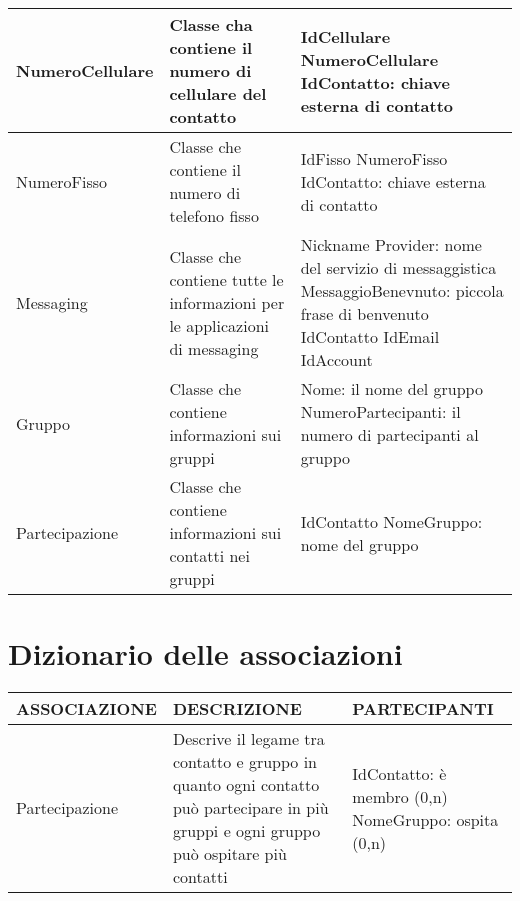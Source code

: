 \documentclass{article}
\begin{document}
\begin{tabular}{| m{3cm} | m{6cm}| m{6cm} |}
            \hline
            NumeroCellulare & Classe cha contiene il numero di cellulare del contatto &
            IdCellulare\newline
            NumeroCellulare\newline
            IdContatto: chiave esterna di contatto\\
            \hline
            NumeroFisso & Classe che contiene il numero di telefono fisso &
            IdFisso\newline
            NumeroFisso\newline
            IdContatto: chiave esterna di contatto\\
            \hline
            Messaging & Classe che contiene tutte le informazioni per le applicazioni di messaging &
            Nickname\newline
            Provider: nome del servizio di messaggistica\newline
            MessaggioBenevnuto: piccola frase di benvenuto\newline
            IdContatto\newline
            IdEmail\newline
            IdAccount\\
            \hline
            Gruppo & Classe che contiene informazioni sui gruppi &
            Nome: il nome del gruppo\newline
            NumeroPartecipanti: il numero di partecipanti al gruppo\\
            \hline
            Partecipazione & Classe che contiene informazioni sui contatti nei gruppi &
            IdContatto\newline
            NomeGruppo: nome del gruppo\\
            \hline
    
        \end{tabular}

    \section{\LARGE Dizionario delle associazioni}
        \begin{tabular}{| m{3cm} | m{6cm}| m{6cm} |}
            \hline
            \textbf{ASSOCIAZIONE} &\textbf{DESCRIZIONE} & \textbf{PARTECIPANTI}\\
            \hline
            Partecipazione & Descrive il legame tra contatto e gruppo in quanto ogni contatto può partecipare in più gruppi e ogni gruppo può ospitare più contatti &
            IdContatto: è membro (0,n)\newline
            NomeGruppo: ospita (0,n)\\
            \hline
        \end{tabular}
    \\ \\ \\
\end{document}
